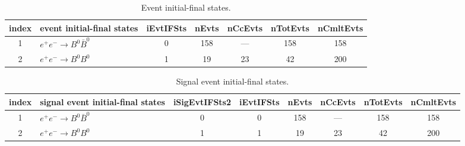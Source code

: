 \documentclass[landscape]{article}
\begin{document}
\clearpage

\begin{table}[htbp!]
\caption{Event initial-final states.}
\small
\centering
\begin{tabular}{|c|>{\centering}p{13.5cm}|c|c|c|c|c|}
\hline
index & event initial-final states & iEvtIFSts & nEvts & nCcEvts & nTotEvts & nCmltEvts \\
\hline
1 & $ e^{+} e^{-} \rightarrow B^{0} \bar{B}^{0} $ & 0 & 158 & --- & 158 & 158 \\
\hline
2 & $ e^{+} e^{-} \rightarrow B^{0} B^{0} $ & 1 & 19 & 23 & 42 & 200 \\
\hline
\end{tabular}
\end{table}

\clearpage

\begin{table}[htbp!]
\caption{Signal event initial-final states.}
\small
\centering
\begin{tabular}{|c|>{\centering}p{12cm}|c|c|c|c|c|c|}
\hline
index & signal event initial-final states & iSigEvtIFSts2 & iEvtIFSts & nEvts & nCcEvts & nTotEvts & nCmltEvts \\
\hline
1 & $ e^{+} e^{-} \rightarrow B^{0} \bar{B}^{0} $ & 0 & 0 & 158 & --- & 158 & 158 \\
\hline
2 & $ e^{+} e^{-} \rightarrow B^{0} B^{0} $ & 1 & 1 & 19 & 23 & 42 & 200 \\
\hline
\end{tabular}
\end{table}
\end{document}

